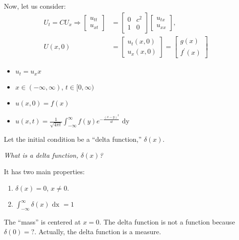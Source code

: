\begin{enumerate}
  Now, let us consider:
  \begin{align}
    U_t = CU_x \Rightarrow
    \begin{bmatrix}
      u_{tt}\\
      u_{xt}
    \end{bmatrix}
    & =
    \begin{bmatrix}
      0 & c^2\\
      1 & 0
    \end{bmatrix}
    \begin{bmatrix}
      u_{tx}\\
      u_{xx}
    \end{bmatrix},\\
    U(x, 0) & =
    \begin{bmatrix}
      u_t(x, 0)\\
      u_x(x, 0)
    \end{bmatrix}
    =
    \begin{bmatrix}
      g(x)\\
      f^\prime(x)
    \end{bmatrix}
  \end{align}
\end{enumerate}



%
\begin{itemize}
  \item $u_t = u_xx$
  \item $x \in (-\infty, \infty)$, $t \in [0, \infty)$
  \item $u(x, 0) = f(x)$
  \item $\displaystyle u(x, t) = \frac{1}{\sqrt{4 \pi t}} \int^\infty_{-\infty} f(y) e^{- \frac{(x - y)^2}{4t}} \text{ dy}$
\end{itemize}

Let the initial condition be a ``delta function,'' $\delta(x)$.

\bigbreak

\emph{What is a delta function, $\delta(x)$?}

It has two main properties:
%
\begin{enumerate}
  \item $\delta(x) = 0$, $x \neq 0$.
  \item $\displaystyle \int^\infty_{-\infty} \delta(x) \text{ dx } = 1$
\end{enumerate}

The ``mass'' is centered at $x = 0$. The delta function is not a function because $\delta(0) = ?$. Actually, the delta function is a measure.

